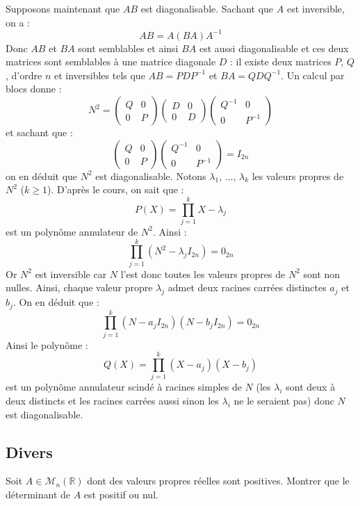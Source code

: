 \documentclass[a4paper,twoside,french,10pt]{VcCours}
\begin{document}
\begin{enumerate}
Supposons maintenant que $AB$ est diagonalisable. Sachant que $A$ est inversible, on a :
$$ AB=A(BA)A^{-1}$$
Donc $AB$ et $BA$ sont semblables et ainsi $BA$ est aussi diagonalisable et ces deux matrices sont semblables à une matrice diagonale $D$ : il existe deux matrices $P$, $Q$, d'ordre $n$ et inversibles tels que $AB=PDP^{-1}$ et $BA= QDQ^{-1}$. Un calcul par blocs donne :
$$ N^2 = \begin{pmatrix}
Q & 0 \\
0 & P
\end{pmatrix} \begin{pmatrix}
D & 0 \\
0 & D
\end{pmatrix} \begin{pmatrix}
Q^{-1} & 0 \\
0 & P^{-1}
\end{pmatrix}$$
et sachant que :
$$ \begin{pmatrix}
Q & 0 \\
0 & P
\end{pmatrix} \begin{pmatrix}
Q^{-1} & 0 \\
0 & P^{-1}
\end{pmatrix} = I_{2n}$$
on en déduit que $N^2$ est diagonalisable. Notons $\lambda_1$, $\ldots$, $\lambda_k$ les valeurs propres de $N^2$ ($k \geq 1$). D'après le cours, on sait que :
$$ P(X) = \prod_{j=1}^k X- \lambda_j$$
est un polynôme annulateur de $N^2$. Ainsi :
$$ \prod_{j=1} ^k (N^2- \lambda_j I_{2n}) = 0_{2n}$$
Or $N^2$ est inversible car $N$ l'est donc toutes les valeurs propres de $N^2$ sont non nulles. Ainsi, chaque valeur propre $\lambda_j$ admet deux racines carrées distinctes $a_j$ et $b_j$. On en déduit que :
$$ \prod_{j=1} ^k (N- a_j I_{2n})(N - b_j I_{2n}) = 0_{2n}$$
Ainsi le polynôme :
$$ Q(X) = \prod_{j=1}^k (X-a_j)(X- b_j)$$
est un polynôme annulateur scindé à racines simples de $N$ (les $\lambda_i$ sont deux à deux distincts et les racines carrées aussi sinon les $\lambda_i$ ne le seraient pas) donc $N$ est diagonalisable.
\end{enumerate}




\subsection{Divers}


\begin{Exercice}{} Soit $A \in \mathcal{M}_{n}(\mathbb{R})$ dont des valeurs propres réelles sont positives. Montrer que le déterminant de $A$ est positif ou nul.
\end{Exercice} 
\end{document}
